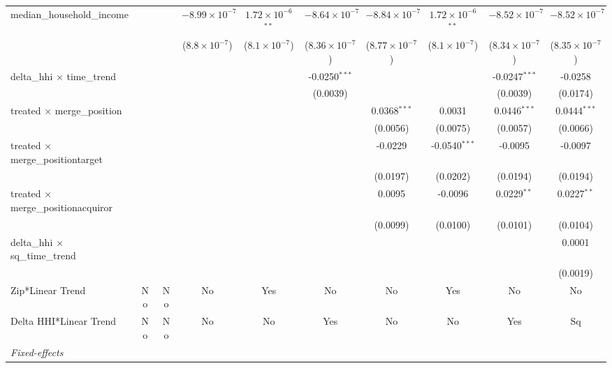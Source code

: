 \begin{table}[H]
{\begin{tabular}{lccccccccc}
 median\_household\_income&   &    & $-8.99\times 10^{-7}$ & $1.72\times 10^{-6}$$^{**}$ & $-8.64\times 10^{-7}$ & $-8.84\times 10^{-7}$ & $1.72\times 10^{-6}$$^{**}$ & $-8.52\times 10^{-7}$ & $-8.52\times 10^{-7}$\\ 

   &   &    & ($8.8\times 10^{-7}$) & ($8.1\times 10^{-7}$) & ($8.36\times 10^{-7}$) & ($8.77\times 10^{-7}$) & ($8.1\times 10^{-7}$) & ($8.34\times 10^{-7}$) & ($8.35\times 10^{-7}$)\\ 

 delta\_hhi $\times $ time\_trend&   &    &    &    & -0.0250$^{***}$ &    &    & -0.0247$^{***}$ & -0.0258\\ 

   &   &    &    &    & (0.0039) &    &    & (0.0039) & (0.0174)\\ 

 treated $\times $ merge\_position&   &    &    &    &    & 0.0368$^{***}$ & 0.0031 & 0.0446$^{***}$ & 0.0444$^{***}$\\ 

   &   &    &    &    &    & (0.0056) & (0.0075) & (0.0057) & (0.0066)\\ 

 treated $\times $ merge\_positiontarget&   &    &    &    &    & -0.0229 & -0.0540$^{***}$ & -0.0095 & -0.0097\\ 

   &   &    &    &    &    & (0.0197) & (0.0202) & (0.0194) & (0.0194)\\ 

 treated $\times $ merge\_positionacquiror&   &    &    &    &    & 0.0095 & -0.0096 & 0.0229$^{**}$ & 0.0227$^{**}$\\ 

   &   &    &    &    &    & (0.0099) & (0.0100) & (0.0101) & (0.0104)\\ 

 delta\_hhi $\times $ sq\_time\_trend&   &    &    &    &    &    &    &    & 0.0001\\ 

   &   &    &    &    &    &    &    &    & (0.0019)\\ 

 Zip*Linear Trend & No & No & No & Yes & No & No & Yes & No & No\\ 

 Delta HHI*Linear Trend & No & No & No & No & Yes & No & No & Yes & Sq\\ 

 \midrule \emph{Fixed-effects}&   &   &   &   &   &   &   &   &  \\ 


\end{tabular}}
\end{table}
